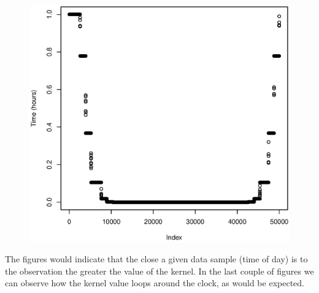 \documentclass[a4paper, twocolumn]{article}
\begin{document}
\begin{figure}[H]
\begin{minipage}[]{0.2\textwidth}
	    \end{minipage}
	    \begin{minipage}[]{0.4\textwidth}
	    	\includegraphics[width=\textwidth]{share/11_time.eps}
	    \end{minipage}
    \end{figure}
	The figures would indicate that the close a given data sample (time of day) is to the observation the greater the value of the kernel. In the last couple of figures we can observe how the kernel value loops around the clock, as would be expected.
\end{document}
